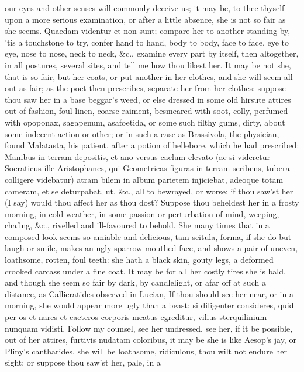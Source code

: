{our eyes and other senses will commonly deceive us; it may be, to thee
thyself upon a more serious examination, or after a little absence, she
is not so fair as she seems. Quaedam videntur et non sunt; compare her
to another standing by, 'tis a touchstone to try, confer hand to hand,
body to body, face to face, eye to eye, nose to nose, neck to neck,
\&c., examine every part by itself, then altogether, in all postures,
several sites, and tell me how thou likest her. It may be not she, that
is so fair, but her coats, or put another in her clothes, and she will
seem all out as fair; as the poet then prescribes, separate her
from her clothes: suppose thou saw her in a base beggar's weed, or else
dressed in some old hirsute attires out of fashion, foul linen, coarse
raiment, besmeared with soot, colly, perfumed with opoponax, sagapenum,
asafoetida, or some such filthy gums, dirty, about some indecent action
or other; or in such a case as Brassivola, the physician, found
Malatasta, his patient, after a potion of hellebore, which he had
prescribed: Manibus in terram depositis, et ano versus caelum elevato
(ac si videretur Socraticus ille Aristophanes, qui Geometricas figuras
in terram scribens, tubera colligere videbatur) atram bilem in album
parietem injiciebat, adeoque totam cameram, et se deturpabat, ut, \&c.,
all to bewrayed, or worse; if thou saw'st her (I say) would thou affect
her as thou dost? Suppose thou beheldest her in a  frosty
morning, in cold weather, in some passion or perturbation of mind,
weeping, chafing, \&c., rivelled and ill-favoured to behold. She many
times that in a composed look seems so amiable and delicious, tam
scitula, forma, if she do but laugh or smile, makes an ugly
sparrow-mouthed face, and shows a pair of uneven, loathsome, rotten,
foul teeth: she hath a black skin, gouty legs, a deformed crooked
carcass under a fine coat. It may be for all her costly tires she is
bald, and though she seem so fair by dark, by candlelight, or afar off
at such a distance, as Callicratides observed in Lucian, If thou
should see her near, or in a morning, she would appear more ugly than a
beast; si diligenter consideres, quid per os et nares et caeteros
corporis meatus egreditur, vilius sterquilinium nunquam vidisti. Follow
my counsel, see her undressed, see her, if it be possible, out of her
attires, furtivis nudatam coloribus, it may be she is like Aesop's jay,
or Pliny's cantharides, she will be loathsome, ridiculous, thou
wilt not endure her sight: or suppose thou saw'st her, pale, in a
}
